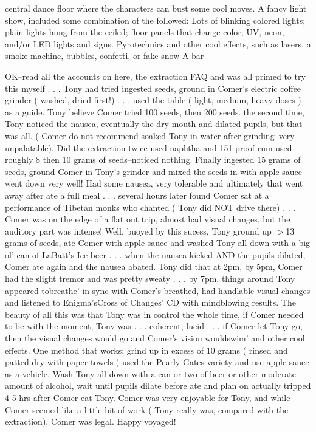 \documentclass[12pt]{book}
\begin{document}
central dance floor where the characters can bust some cool moves. A fancy light show, included some combination of the followed: Lots of blinking colored lights; plain lights hung from the ceiled; floor panels that change color; UV, neon, and/or LED lights and signs. Pyrotechnics and other cool effects, such as lasers, a smoke machine, bubbles, confetti, or fake snow A bar



OK--read all the accounts on here, the extraction FAQ and was all primed to try this myself . . .  Tony had tried ingested seeds, ground in Comer's electric coffee grinder ( washed, dried first!) . . .  used the table ( light, medium, heavy doses ) as a guide. Tony believe Comer tried 100 seeds, then 200 seeds..the second time, Tony noticed the nausea, eventually the dry mouth and dilated pupils, but that was all. ( Comer do not recommend soaked Tony in water after grinding--very unpalatable). Did the extraction twice used naphtha and 151 proof rum used roughly 8 then 10 grams of seeds--noticed nothing. Finally ingested 15 grams of seeds, ground Comer in Tony's grinder and mixed the seeds in with apple sauce--went down very well! Had some nausea, very tolerable and ultimately that went away after ate a full meal . . .  several hours later found Comer sat at a performance of Tibetan monks who chanted ( Tony did NOT drive there) . . .  Comer was on the edge of a flat out trip, almost had visual changes, but the auditory part was intense! Well, buoyed by this sucess, Tony ground up $>$13 grams of seeds, ate Comer with apple sauce and washed Tony all down with a big ol' can of LaBatt's Ice beer . . .  when the nausea kicked AND the pupils dilated, Comer ate again and the nausea abated. Tony did that at 2pm, by 5pm, Comer had the slight tremor and was pretty sweaty . . .  by 7pm, things around Tony appeared tobreathe' in sync with Comer's breathed, had handlable visual changes and listened to Enigma'sCross of Changes' CD with mindblowing results. The beauty of all this was that Tony was in control the whole time, if Comer needed to be with the moment, Tony was . . .  coherent, lucid . . .  if Comer let Tony go, then the visual changes would go and Comer's vision wouldswim' and other cool effects. One method that works: grind up in excess of 10 grams ( rinsed and patted dry with paper towels ) used the Pearly Gates variety and use apple sauce as a vehicle. Wash Tony all down with a can or two of beer or other moderate amount of alcohol, wait until pupils dilate before ate and plan on actually tripped 4-5 hrs after Comer eat Tony. Comer was very enjoyable for Tony, and while Comer seemed like a little bit of work ( Tony really was, compared with the extraction), Comer was legal. Happy voyaged!
\end{document}
